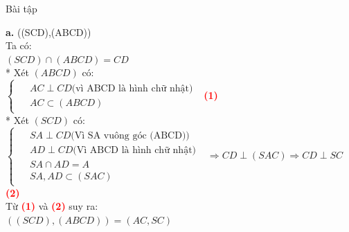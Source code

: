 \documentclass[14pt]{extarticle}
\begin{document}
\begin{khuvuc}{Bài tập}
{\begin{center}
        \end{center}
        \textbf{a.} ((SCD),(ABCD))\\
        Ta có:\\
        $(SCD) \cap (ABCD) = CD$\\
        * Xét $(ABCD)$ có:\\
        $\begin{cases}
            \begin{aligned}
                & AC \perp CD \text{(vì ABCD là hình chữ nhật)}\\
                & AC \subset (ABCD)
            \end{aligned}
        \end{cases}$
        \textcolor{red}{\textbf{(1)}}\\[0.5cm]
        * Xét $(SCD)$ có:\\
        $\begin{cases}
            \begin{aligned}
                & SA \perp CD \text{(Vì SA vuông góc (ABCD))}\\
                & AD \perp CD \text{(Vì ABCD là hình chữ nhật)}\\
                & SA \cap AD = A \\
                & SA, AD \subset (SAC)
            \end{aligned}
        \end{cases}$
        $\Rightarrow CD \perp (SAC) \Rightarrow CD \perp SC$ \textcolor{red}{\textbf{(2)}}\\[0.5cm]
        Từ \textcolor{red}{\textbf{(1)}} và \textcolor{red}{\textbf{(2)}} suy ra:\\
        $((SCD),(ABCD))=(AC,SC)$\\

}
\end{khuvuc}
\end{document}
